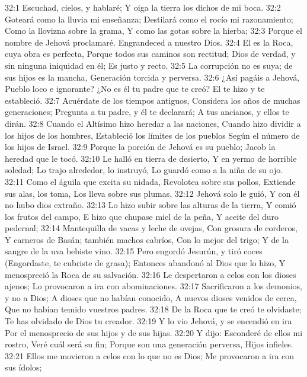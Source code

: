 32:1 Escuchad, cielos, y hablaré;  
Y oiga la tierra los dichos de mi boca. 
32:2   Goteará como la lluvia mi enseñanza; 
Destilará como el rocío mi razonamiento;  
Como la llovizna sobre la grama,  
Y como las gotas sobre la hierba;  
32:3    Porque el nombre de Jehová proclamaré.  
Engrandeced a nuestro Dios.  
32:4    El es la Roca, cuya obra es perfecta,  
Porque todos sus caminos son rectitud;  
Dios de verdad, y sin ninguna iniquidad en él;  
Es justo y recto.  
32:5    La corrupción no es suya; de sus hijos es la mancha,  
Generación torcida y perversa.  
32:6     ¿Así pagáis a Jehová,  
Pueblo loco e ignorante?  
¿No es él tu padre que te creó?  
El te hizo y te estableció.  
32:7    Acuérdate de los tiempos antiguos,  
Considera los años de muchas generaciones;  
Pregunta a tu padre, y él te declarará;  
A tus ancianos, y ellos te dirán. 
32:8   Cuando el Altísimo hizo heredar a las naciones,  
Cuando hizo dividir a los hijos de los hombres,  
Estableció los límites de los pueblos  
Según el número de los hijos de Israel.  
32:9   Porque la porción de Jehová es su pueblo;  
 Jacob la heredad que le tocó.  
32:10 Le halló en tierra de desierto,  
Y en yermo de horrible soledad;  
Lo trajo alrededor, lo instruyó,  
Lo guardó como a la niña de su ojo.  
32:11 Como el águila que excita su nidada,  
Revolotea sobre sus pollos,  
Extiende sus alas, los toma,  
Los lleva sobre sus plumas, 
32:12 Jehová solo le guió,  
Y con él no hubo dios extraño.  
32:13 Lo hizo subir sobre las alturas de la tierra,  
Y comió los frutos del campo,  
E hizo que chupase miel de la peña,  
Y aceite del duro pedernal;  
32:14 Mantequilla de vacas y leche de ovejas,  
Con grosura de corderos, 
Y carneros de Basán; también machos cabríos,  
Con lo mejor del trigo;  
Y de la sangre de la uva bebiste vino.  
32:15 Pero engordó Jesurún, y tiró coces  
(Engordaste, te cubriste de grasa);  
Entonces abandonó al Dios que lo hizo,  
Y menospreció la Roca de su salvación. 
32:16 Le despertaron a celos con los dioses ajenos;  
Lo provocaron a ira con abominaciones. 
32:17 Sacrificaron a los demonios, y no a Dios; 
A dioses que no habían conocido,  
A nuevos dioses venidos de cerca,  
Que no habían temido vuestros padres. 
32:18 De la Roca que te creó te olvidaste;  
Te has olvidado de Dios tu creador.  
32:19 Y lo vio Jehová, y se encendió en ira  
Por el menosprecio de sus hijos y de sus hijas. 
32:20 Y dijo: Esconderé de ellos mi rostro,  
Veré cuál será su fin;  
Porque son una generación perversa,  
Hijos infieles.  
32:21 Ellos me movieron a celos con lo que no es Dios;  
Me provocaron a ira con sus ídolos;  
